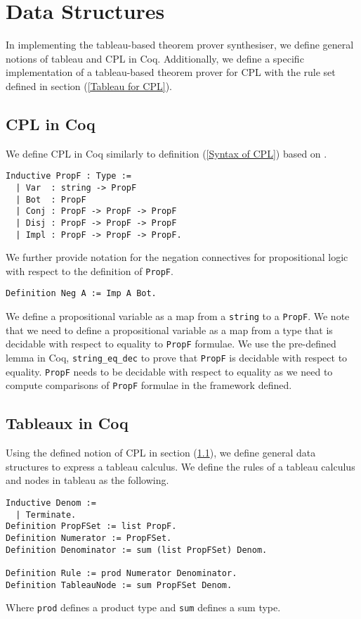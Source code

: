 \documentclass{llncs}
\begin{document}
\section{Data Structures}
%
In implementing the tableau-based theorem prover synthesiser, we define general
notions of tableau and CPL in Coq. Additionally, we define a specific
implementation of a tableau-based theorem prover for CPL with the rule set
defined in section (\ref{Tableau for CPL}).
%
\subsection{CPL in Coq}\label{CPL in Coq}
%
We define CPL in Coq similarly to definition (\ref{Syntax of CPL}) based on
\cite{van2015propositional}.
%
\begin{verbatim}
Inductive PropF : Type :=
  | Var  : string -> PropF
  | Bot  : PropF
  | Conj : PropF -> PropF -> PropF
  | Disj : PropF -> PropF -> PropF
  | Impl : PropF -> PropF -> PropF.
\end{verbatim}
%
We further provide notation for the negation connectives for propositional
logic with respect to the definition of \verb+PropF+.
%
\begin{verbatim}
Definition Neg A := Imp A Bot.
\end{verbatim}
%
We define a propositional variable as a map from a \verb+string+ to a
\verb+PropF+. We note that we need to define a propositional variable as a map
from a type that is decidable with respect to  equality to \verb+PropF+
formulae. We use the pre-defined lemma in Coq, \verb+string_eq_dec+ to prove
that \verb+PropF+ is decidable with respect to equality. \verb+PropF+ needs to
be decidable with respect to equality as we need to compute comparisons of
\verb+PropF+ formulae in the framework defined.
%
\subsection{Tableaux in Coq}
%
Using the defined notion of CPL in section (\ref{CPL in Coq}), we define
general data structures to express a tableau calculus. We define the rules of a
tableau calculus and nodes in tableau as the following.
%
\begin{verbatim}
Inductive Denom :=
  | Terminate.
Definition PropFSet := list PropF.
Definition Numerator := PropFSet.
Definition Denominator := sum (list PropFSet) Denom.

Definition Rule := prod Numerator Denominator.
Definition TableauNode := sum PropFSet Denom.
\end{verbatim}
%
Where \verb+prod+ defines a product type and \verb+sum+ defines a sum type.
\end{document}
